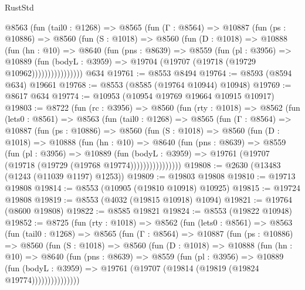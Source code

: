 \begin{lexlean}{RustStd}
\begin{coremodule}
          @8563
            (fun (tail0 : @1268) =>
            @8565
              (fun (Γ : @8564) =>
              @10887
                (fun (ps : @10886) =>
                @8560
                  (fun (S : @1018) =>
                  @8560
                    (fun (D : @1018) =>
                    @10888
                      (fun (hn : @10) =>
                      @8640
                        (fun (pns : @8639) =>
                        @8559
                          (fun (pl : @3956) =>
                          @10889
                            (fun (bodyL : @3959) =>
                            @19704 (@19707 (@19718 (@19729 @10962))))))))))))))))
    @634
@19761 := @8553 @8494
@19764 := @8593 (@8594 @634) @19661
@19768 := @8553 (@8585 (@19764 @10944) @10948)
@19769 := @8617 @634
@19774 := @10953 (@10954 @19769 @19664 @10915 @10917)
@19803 := @8722
    (fun (rc : @3956) =>
    @8560
      (fun (rty : @1018) =>
      @8562
        (fun (lets0 : @8561) =>
        @8563
          (fun (tail0 : @1268) =>
          @8565
            (fun (Γ : @8564) =>
            @10887
              (fun (ps : @10886) =>
              @8560
                (fun (S : @1018) =>
                @8560
                  (fun (D : @1018) =>
                  @10888
                    (fun (hn : @10) =>
                    @8640
                      (fun (pns : @8639) =>
                      @8559
                        (fun (pl : @3956) =>
                        @10889
                          (fun (bodyL : @3959) =>
                          @19761 (@19707 (@19718 (@19729 (@19768 @19774))))))))))))))))
@19808 := @2630 (@13483 (@1243 (@11039 @1197) @1253))
@19809 := @19803 @19808
@19810 := @19713 @19808
@19814 := @8553 (@10905 (@19810 @10918) @10925)
@19815 := @19724 @19808
@19819 := @8553 (@4032 (@19815 @10918) @1094)
@19821 := @19764 (@8600 @19808)
@19822 := @8585 @19821
@19824 := @8553 (@19822 @10948)
@19852 := @8725
    (fun (rty : @1018) =>
    @8562
      (fun (lets0 : @8561) =>
      @8563
        (fun (tail0 : @1268) =>
        @8565
          (fun (Γ : @8564) =>
          @10887
            (fun (ps : @10886) =>
            @8560
              (fun (S : @1018) =>
              @8560
                (fun (D : @1018) =>
                @10888
                  (fun (hn : @10) =>
                  @8640
                    (fun (pns : @8639) =>
                    @8559
                      (fun (pl : @3956) =>
                      @10889
                        (fun (bodyL : @3959) =>
                        @19761 (@19707 (@19814 (@19819 (@19824 @19774)))))))))))))))

\end{coremodule}
\end{lexlean}
